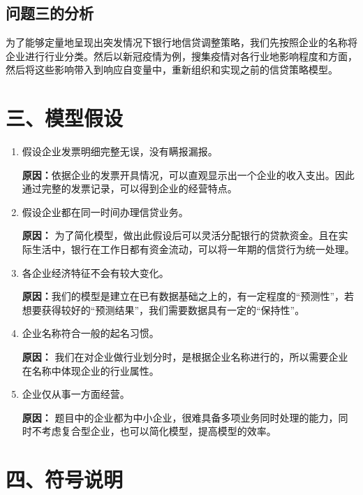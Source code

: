 \documentclass{my_paper}
\begin{document}
\subsection{问题三的分析}
为了能够定量地呈现出突发情况下银行地信贷调整策略，我们先按照企业的名称将企业进行行业分类。然后以新冠疫情为例，搜集疫情对各行业地影响程度和方面，然后将这些影响带入到响应自变量中，重新组织和实现之前的信贷策略模型。

\section{三、模型假设}
\begin{enumerate}
    \item 假设企业发票明细完整无误，没有瞒报漏报。
    
    \textbf{原因：}依据企业的发票开具情况，可以直观显示出一个企业的收入支出。因此通过完整的发票记录，可以得到企业的经营特点。

    \item 假设企业都在同一时间办理信贷业务。
    
    \textbf{原因：}
    为了简化模型，做出此假设后可以灵活分配银行的贷款资金。且在实际生活中，银行在工作日都有资金流动，可以将一年期的信贷行为统一处理。

    \item 各企业经济特征不会有较大变化。
    
    \textbf{原因：}我们的模型是建立在已有数据基础之上的，有一定程度的“预测性”，若想要获得较好的“预测结果”，我们需要数据具有一定的“保持性”。

    \item 企业名称符合一般的起名习惯。
    
    \textbf{原因：}
    我们在对企业做行业划分时，是根据企业名称进行的，所以需要企业在名称中体现企业的行业属性。

    \item 企业仅从事一方面经营。
    
    \textbf{原因：}
    题目中的企业都为中小企业，很难具备多项业务同时处理的能力，同时不考虑复合型企业，也可以简化模型，提高模型的效率。

    
\end{enumerate}

\section{四、符号说明}
\end{document}

